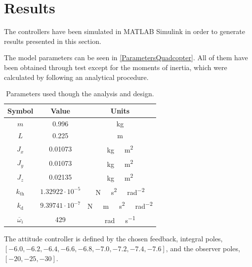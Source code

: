 \section{Results}

The controllers have been simulated in MATLAB Simulink in order to generate results presented in this section. 

The model parameters can be seen in \autoref{ParametersQuadcopter}. All of them have been obtained through test except for the moments of inertia, which were calculated by following an analytical procedure.

\begin{table}[H]
    \centering
    \begin{tabular}{c|c|c}
        \textbf{Symbol} &\textbf{Value} &\textbf{Units}\\
        \hline %
        $m$ & 0.996       &kg\\
        \hline %
        $L$  &   0.225       & m\\
        \hline %
        $J_x$  & 0.01073       & \si{kg \  m^2}\\
        \hline %
        $J_y$  & 0.01073       & \si{kg \  m^2}\\
        \hline %
        $J_z$  & 0.02135       & \si{kg \  m^2}\\
        \hline %
        $k_{\mathrm{th}}$  & $1.32922\cdot10^{-5}$       & \si{N \  s^2 \  rad^{-2}}\\
        \hline %
        $k_{\mathrm{d}}$  & $9.39741 \cdot10^{-7}$       & \si{N \  m \  s^2 \  rad^{-2}}\\
        \hline %
        $\overline{\omega}_i$& 429      & \si{rad \ s^{-1}}\\
        
    \end{tabular}
    \caption{Parameters used though the analysis and design.}
    \label{ParametersQuadcopter}
\end{table}
The attitude controller is defined by the chosen feedback, integral poles, $[-6.0, -6.2, -6.4, -6.6, -6.8, -7.0, -7.2, -7.4, -7.6]$, and  the observer poles, $[-20, -25, -30]$.

